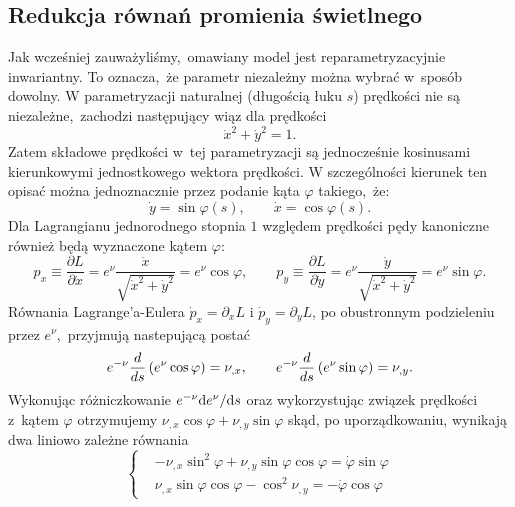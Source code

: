 \subsection{Redukcja równań promienia świetlnego}
\indent Jak wcześniej zauważyliśmy,~omawiany model jest reparametryzacyjnie inwariantny. To oznacza,~że parametr niezależny można wybrać w~sposób dowolny.
W parametryzacji naturalnej (długością łuku $s$) prędkości nie są niezależne,~zachodzi następujący wiąz dla prędkości $$\dot{x}^2+\dot{y}^2=1.$$ Zatem składowe prędkości w~tej parametryzacji są jednocześnie kosinusami kierunkowymi jednostkowego wektora prędkości. W szczególności kierunek ten opisać można jednoznacznie przez podanie kąta $\varphi$ takiego,~że: $$\dot{y}=\sin{\varphi(s)}, \qquad \dot{x}=\cos\varphi(s).$$
%
%
%
%
Dla Lagrangianu jednorodnego stopnia $1$ względem prędkości pędy kanoniczne również będą wyznaczone kątem $\varphi$: 
$$p_x\equiv\frac{\partial L}{\partial \dot{x}}=e^{\nu}\frac{\dot{x}}{\sqrt{\dot{x}^{2}+\dot{y}^{2}}}=e^{\nu}\cos\varphi,\qquad p_y\equiv\frac{\partial L}{\partial \dot{y}}=e^{\nu}\frac{\dot{y}}{\sqrt{\dot{x}^{2}+\dot{y}^{2}}}=e^{\nu}\sin\varphi.$$
Równania Lagrange'a-Eulera $\dot{p}_x=\partial_xL$ i $\dot{p}_y=\partial_yL$, po obustronnym podzieleniu przez $e^{\nu}$,~przyjmują nastepującą postać
$$e^{-\nu}\frac{d}{ds}\left({e^{\nu}\cos\varphi}\right)=\nu_{,x}, \qquad e^{-\nu}\frac{d}{ds}\left({e^{\nu}\sin\varphi}\right)=\nu_{,y}.$$
Wykonując różniczkowanie $e^{-\nu}{\rm d}{e^{\nu}}/{{\rm d}{s}}$ oraz wykorzystując związek prędkości z~kątem $\varphi$ otrzymujemy $\nu_{,x}\cos\varphi+\nu_{,y}\sin\varphi$ skąd, po uporządkowaniu, wynikają
dwa liniowo zależne równania
$$\left\{\begin{matrix}
 & -\nu_{,x}\sin^{2}{\varphi}+\nu_{,y}\sin\varphi\cos\varphi=\dot{\varphi}\sin{\varphi} \\ 
 & \nu_{,x}\sin\varphi\cos\varphi-\cos^{2}\nu_{,y}=-\dot{\varphi}\cos{\varphi}
\end{matrix}\right.$$
